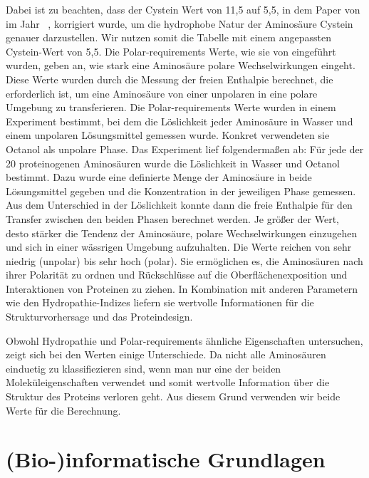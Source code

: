 \documentclass[german,version-2022-01]{uzl-thesis}
\begin{document}
Dabei ist zu beachten, dass der Cystein Wert von 11,5 auf 5,5, in dem Paper  von \citeauthor{woese_evolution_1973} im Jahr \citeyear{woese_evolution_1973}~\cite{woese_evolution_1973}, korrigiert wurde, um die hydrophobe Natur der Aminos\"aure Cystein genauer darzustellen. Wir nutzen somit die Tabelle mit einem angepassten Cystein-Wert von 5,5. 
Die Polar-requirements Werte, wie sie von \citeauthor{woese_fundamental_1966} eingef\"uhrt wurden, geben an, wie stark eine Aminos\"aure polare Wechselwirkungen eingeht. Diese Werte wurden durch die Messung der freien Enthalpie berechnet, die erforderlich ist, um eine Aminos\"aure von einer unpolaren in eine polare Umgebung zu transferieren. Die Polar-requirements Werte wurden in einem Experiment bestimmt, bei dem die L\"oslichkeit jeder Aminos\"aure in Wasser und einem unpolaren L\"osungsmittel gemessen wurde. Konkret verwendeten sie Octanol als unpolare Phase. Das Experiment lief folgenderma\ss{}en ab: F\"ur jede der 20 proteinogenen Aminos\"auren wurde die L\"oslichkeit in Wasser und Octanol bestimmt. Dazu wurde eine definierte Menge der Aminos\"aure in beide L\"osungsmittel gegeben und die Konzentration in der jeweiligen Phase gemessen. Aus dem Unterschied in der L\"oslichkeit konnte dann die freie Enthalpie f\"ur den Transfer zwischen den beiden Phasen berechnet werden. Je gr\"o\ss{}er der Wert, desto st\"arker die Tendenz der Aminos\"aure, polare Wechselwirkungen einzugehen und sich in einer w\"assrigen Umgebung aufzuhalten. Die Werte reichen von sehr niedrig (unpolar) bis sehr hoch (polar). Sie erm\"oglichen es, die Aminos\"auren nach ihrer Polarit\"at zu ordnen und R\"uckschl\"usse auf die Oberfl\"achenexposition und Interaktionen von Proteinen zu ziehen. In Kombination mit anderen Parametern wie den Hydropathie-Indizes liefern sie wertvolle Informationen f\"ur die Strukturvorhersage und das Proteindesign.

Obwohl Hydropathie und Polar-requirements \"ahnliche Eigenschaften untersuchen, zeigt sich bei den Werten einige Unterschiede. Da nicht alle Aminos\"auren einduetig zu klassifiezieren sind, wenn man nur eine der beiden Molek\"uleigenschaften verwendet und somit wertvolle Information \"uber die Struktur des Proteins verloren geht. Aus diesem Grund verwenden wir beide Werte f\"ur die Berechnung. 

\section{(Bio-)informatische Grundlagen}
\end{document}
